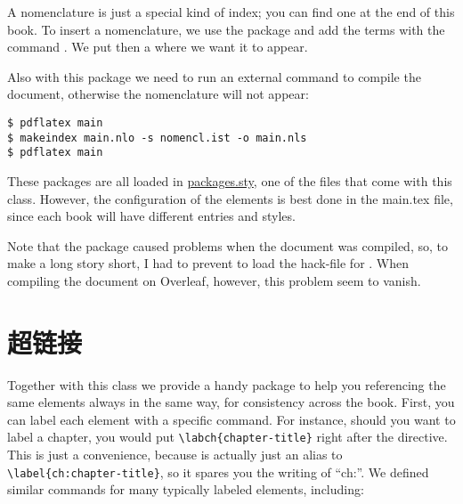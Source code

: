 A nomenclature is just a special kind of index; you can find one at the end of
this book. To insert a nomenclature, we use the package  and
add the terms with the command . We put then a
 where we want it to appear.

Also with this package we need to run an external command to compile the
document, otherwise the nomenclature will not appear:

\begin{lstlisting}[style=kaolstplain]
$ pdflatex main
$ makeindex main.nlo -s nomencl.ist -o main.nls
$ pdflatex main
\end{lstlisting}

These packages are all loaded in
\href{style/packages.sty}{packages.sty}, one of the files that come with
this class. However, the configuration of the elements is best done in
the main.tex file, since each book will have different entries and
styles.

Note that the  package caused problems when the
document was compiled, so, to make a long story short, I had to prevent
 to load the hack-file for . When
compiling the document on Overleaf, however, this problem seem to
vanish.


\section{超链接}

Together with this class we provide a handy package to help you
referencing the same elements always in the same way, for consistency
across the book. First, you can label each element with a specific
command. For instance, should you want to label a chapter, you would put
\lstinline|\labch{chapter-title}| right after the 
directive. This is just a convenience, because  is
actually just an alias to \lstinline|\label{ch:chapter-title}|, so it
spares you the writing of \enquote{ch:}. We defined similar commands for
many typically labeled elements, including:

